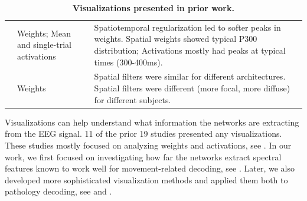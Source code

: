 \begin{table}[ht]
\begin{tabularx}{\textwidth}{p{}p{}p{}}
\cite{manor_convolutional_2015} & Weights; Mean and single-trial activations & Spatiotemporal regularization led to softer peaks in weights. Spatial weights showed typical P300 distribution; Activations mostly had peaks at typical times (300-400ms). \\
\cite{cecotti_convolutional_2011} & Weights & Spatial filters were similar for different architectures. Spatial filters were different (more focal, more diffuse) for different subjects. \\
        \bottomrule
    \end{tabularx}
    \caption[Visualizations presented in prior work.]{\textbf{Visualizations presented in prior work.}}  \label{prior-work-visualizations-table}
\end{table}


    Visualizations can help understand what information the networks are
extracting from the EEG signal. 11 of the prior 19 studies presented any
visualizations. These studies mostly focused on analyzing weights and
activations, see . In
our work, we first focused on investigating how far the networks extract
spectral features known to work well for movement-related decoding, see
. Later, we also developed
more sophisticated visualization methods and applied them both to
pathology decoding, see  and
.

